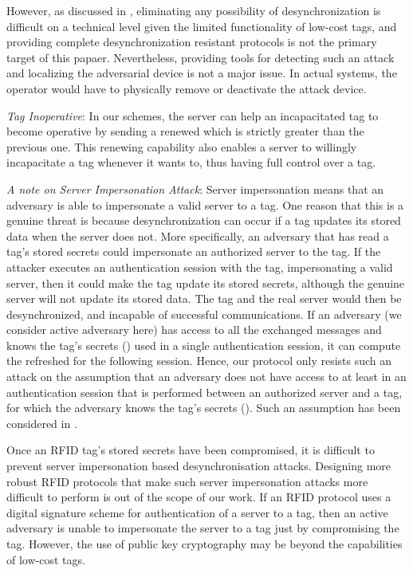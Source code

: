 \documentclass{easychair}
\begin{document}
However, as discussed in \cite{AutoID}, eliminating any possibility of desynchronization is difficult on a technical level given the limited functionality of low-cost tags, and providing complete desynchronization resistant protocols is not the primary target of this papaer. Nevertheless, providing tools for detecting such an attack and localizing the adversarial device is not a major issue. In actual systems, the operator would have to physically remove or deactivate the attack device.

\noindent  \textit{Tag Inoperative}: In our schemes, the server can 
help an incapacitated tag to become operative by sending a renewed  
which is strictly greater than the previous one. This renewing capability also 
enables a server to willingly incapacitate a tag whenever it wants to, thus having 
full control over a tag. 


\noindent  \textit{A note on Server Impersonation Attack}: Server impersonation \cite{impersonation:ubi} means that an adversary is able to impersonate a valid server
to a tag. One reason that this is a genuine threat is because desynchronization can
occur if a tag updates its stored data when the server does not. More specifically, an adversary that has
read a tag's stored secrets could impersonate an authorized server to the tag. If
the attacker executes an authentication session with the tag, impersonating a valid
server, then it could make the tag update its stored secrets, although the genuine
server will not update its stored data. The tag and the real server would then be
desynchronized, and incapable of successful communications. If an adversary (we consider active adversary here) has
access to all the exchanged messages and knows the tag's secrets () used in a
single authentication session, it can compute the refreshed  for the following
session. Hence, our protocol only resists such an attack on the assumption
that an adversary does not have access to at least  in an authentication session that is performed between an authorized
server and a tag, for which the adversary knows the tag's secrets (). Such an assumption has been considered in \cite{impersonation:phd}.

Once an RFID tag's stored secrets have been compromised, it is difficult to prevent
server impersonation based desynchronisation attacks. Designing more robust RFID protocols that make such server
impersonation attacks more difficult to perform is out of the scope of our work. If an RFID protocol uses a digital
signature scheme for authentication of a server to a tag, then an active adversary is unable to
impersonate the server to a tag just by compromising the tag. However, the use of
public key cryptography may be beyond the capabilities of low-cost tags.
\end{document}

